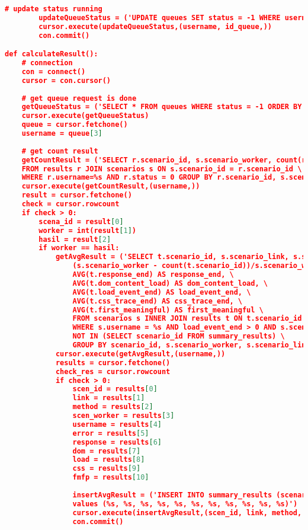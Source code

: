 \begin{lstlisting}[frame=single,tabsize=2,breaklines,caption={Isi berkas queue.py},label=queuepy, captionpos=b, language=json]
		# update status running
		updateQueueStatus = ('UPDATE queues SET status = -1 WHERE username=%s AND id=%s')
		cursor.execute(updateQueueStatus,(username, id_queue,))
		con.commit()

def calculateResult():
	# connection
	con = connect()
	cursor = con.cursor()
	
	# get queue request is done
	getQueueStatus = ('SELECT * FROM queues WHERE status = -1 ORDER BY created_at LIMIT 1')
	cursor.execute(getQueueStatus)
	queue = cursor.fetchone()
	username = queue[3]
	
	# get count result
	getCountResult = ('SELECT r.scenario_id, s.scenario_worker, count(r.scenario_id) AS jml \
	FROM results r JOIN scenarios s ON s.scenario_id = r.scenario_id \
	WHERE r.username=%s AND r.status = 0 GROUP BY r.scenario_id, s.scenario_worker')
	cursor.execute(getCountResult,(username,))
	result = cursor.fetchone()
	check = cursor.rowcount
	if check > 0:
		scena_id = result[0]
		worker = int(result[1])
		hasil = result[2]
		if worker == hasil:
			getAvgResult = ('SELECT t.scenario_id, s.scenario_link, s.scenario_method, s.scenario_worker ,t.username, \
				(s.scenario_worker - count(t.scenario_id))/s.scenario_worker*100 AS error, \
				AVG(t.response_end) AS response_end, \
				AVG(t.dom_content_load) AS dom_content_load, \
				AVG(t.load_event_end) AS load_event_end, \
				AVG(t.css_trace_end) AS css_trace_end, \
				AVG(t.first_meaningful) AS first_meaningful \
				FROM scenarios s INNER JOIN results t ON t.scenario_id = s.scenario_id \
				WHERE s.username = %s AND load_event_end > 0 AND s.scenario_id \
				NOT IN (SELECT scenario_id FROM summary_results) \
				GROUP BY scenario_id, s.scenario_worker, s.scenario_link, s.scenario_method, t.username')
			cursor.execute(getAvgResult,(username,))
			results = cursor.fetchone()
			check_res = cursor.rowcount
			if check > 0:
				scen_id = results[0]
				link = results[1]
				method = results[2]
				scen_worker = results[3]
				username = results[4]
				error = results[5]
				response = results[6]
				dom = results[7]
				load = results[8]
				css = results[9]
				fmfp = results[10]
				
				insertAvgResult = ('INSERT INTO summary_results (scenario_id, link, method, worker, username, error, response_end, dom_content_load, load_event_end, css_trace_end, first_meaningful) \
				values (%s, %s, %s, %s, %s, %s, %s, %s, %s, %s, %s)')
				cursor.execute(insertAvgResult,(scen_id, link, method, scen_worker, username, error, response, dom, load, css, fmfp,))
				con.commit()
				

\end{lstlisting}
